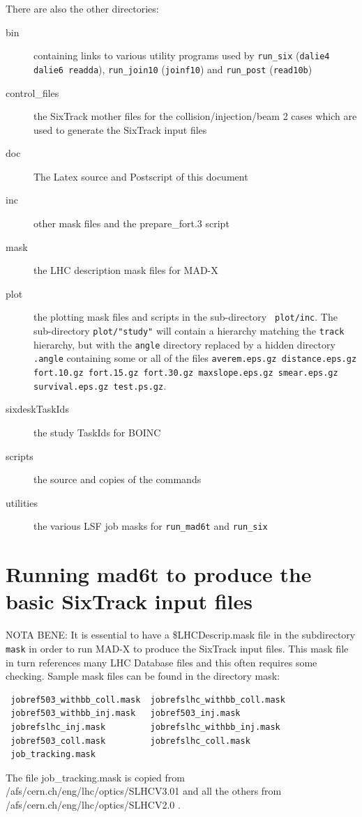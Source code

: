\documentclass{cernatsnote}
\begin{document}
There are also the other directories:
\begin{description}
\item [bin] containing links to various utility programs used by \texttt{run\_six}
(\texttt{dalie4 dalie6 readda}), \texttt{run\_join10} (\texttt{joinf10})
and \texttt{run\_post} (\texttt{read10b}) \item [control\_files] the SixTrack mother
  files for the collision/injection/beam 2 cases which are used to generate the
  SixTrack input files
\item [doc] The Latex source and Postscript of this document
\item [inc] other mask files and the prepare\_fort.3 script
\item [mask] the LHC description mask files for MAD-X
\item [plot] the plotting mask files and scripts in the sub-directory {\tt
  plot/inc}.  The sub-directory \texttt{plot/"study"} will contain a hierarchy
  matching the \texttt{track} hierarchy, but with the \texttt{angle} directory
  replaced by a hidden directory \texttt{.angle}  containing some or all of the
  files {\tt averem.eps.gz distance.eps.gz fort.10.gz fort.15.gz fort.30.gz
    maxslope.eps.gz smear.eps.gz survival.eps.gz test.ps.gz}.
\item [sixdeskTaskIds] the study TaskIds for BOINC
\item [scripts] the source and copies of the commands
\item [utilities] the various LSF job masks for \texttt{run\_mad6t} and \texttt{run\_six}
\end{description}
\section{Running mad6t to produce the basic SixTrack input files}
\label{sec:mad_6t}
NOTA BENE: It is essential to have a \$LHCDescrip.mask file in the subdirectory
\texttt{mask} in order to run MAD-X to produce the SixTrack input files. This mask
file in turn references many LHC Database files and this often requires some
checking.  Sample mask files can be found in the directory mask:
\begin{verbatim}
 jobref503_withbb_coll.mask  jobrefslhc_withbb_coll.mask  
 jobref503_withbb_inj.mask   jobref503_inj.mask        
 jobrefslhc_inj.mask         jobrefslhc_withbb_inj.mask
 jobref503_coll.mask         jobrefslhc_coll.mask        
 job_tracking.mask
\end{verbatim}
The file job\_tracking.mask is copied from
/afs/cern.ch/eng/lhc/optics/SLHCV3.01 and all the others from
/afs/cern.ch/eng/lhc/optics/SLHCV2.0 \cite{31b}.
\end{document}
